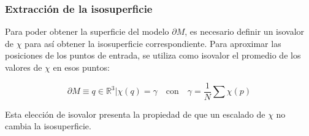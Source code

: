 	\subsubsection{Extracción de la isosuperficie}
	Para poder obtener la superficie del modelo $\partial M$, es necesario
	definir un isovalor de $\chi$ para así obtener la isosuperficie correspondiente.
	Para aproximar las posiciones de los puntos de entrada, se utiliza como isovalor
	el promedio de los valores de $\chi$ en esos puntos:

	\[\partial M \equiv {q \in \mathbb{R}^3 | \chi(q) = \gamma} \quad \mbox{con}
		\quad \gamma = \frac{1}{N} \sum \chi(p) \]

	Esta elección de isovalor presenta la propiedad de que un escalado de $\chi$ no cambia la isosuperficie.
